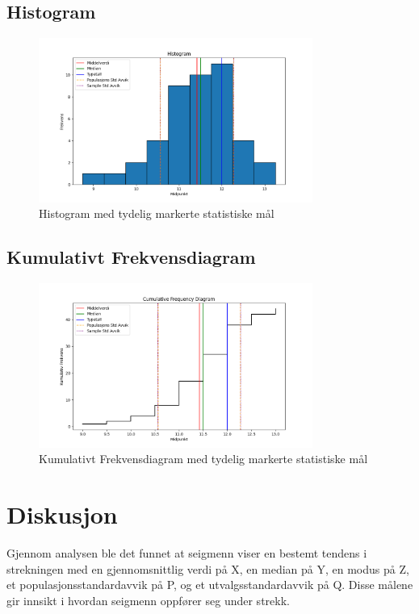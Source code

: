 \documentclass{article}
\begin{document}
\subsection{Histogram}
\begin{figure}[H]
    \centering
    \includegraphics[width=0.8\textwidth]{Figure_1.png}
    \caption{Histogram med tydelig markerte statistiske mål}
\end{figure}

\subsection{Kumulativt Frekvensdiagram}
\begin{figure}[H]
    \centering
    \includegraphics[width=0.8\textwidth]{Figure_3.png}
    \caption{Kumulativt Frekvensdiagram med tydelig markerte statistiske mål}
\end{figure}

\section{Diskusjon}
Gjennom analysen ble det funnet at seigmenn viser en bestemt tendens i strekningen med en gjennomsnittlig verdi på X, en median på Y, en modus på Z, et populasjonsstandardavvik på P, og et utvalgsstandardavvik på Q. Disse målene gir innsikt i hvordan seigmenn oppfører seg under strekk.
\end{document}
